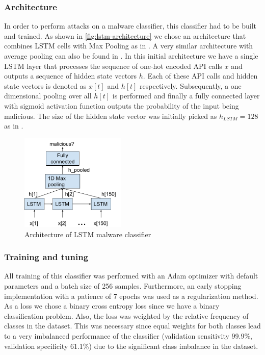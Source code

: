 \documentclass[final]{cvpr}
\begin{document}
\subsubsection{Architecture}
In order to perform attacks on a malware classifier, this classifier had to be 
built and trained. As shown in \autoref{fig:lstm-architecture} we chose an 
architecture that combines LSTM cells with Max Pooling as in 
\autocite[4]{agrawal2018robust}. A very similar architecture 
with average pooling can also be found in \autocite[4]{papernot2016crafting}. 
In this initial architecture we have a single LSTM layer that processes the 
sequence of one-hot encoded API calls $x$ and outputs a sequence of 
hidden state vectors $h$. Each of these API calls and hidden state vectors is 
denoted as $x[t]$ and $h[t]$ respectively. Subsequently, a one dimensional 
pooling over all $h[t]$ is 
performed and finally a fully connected layer with sigmoid activation function 
outputs the probability of the input being malicious. The size of the hidden 
state vector was initially picked as $h_{LSTM} = 128$ as in 
\autocite[10]{DBLP:journals/corr/RosenbergSRE17}.
\begin{figure}
	\centering
	\includegraphics[width=5cm]{lstm-architecture}
	\caption{Architecture of LSTM malware classifier}
	\label{fig:lstm-architecture}
\end{figure}
\subsubsection{Training and tuning}
\label{sec:train}
All training of this classifier was performed with an Adam optimizer 
\autocite{kingma2017adam} with default parameters and a batch size of 256 
samples. Furthermore, an early stopping implementation \autocite{Sunde20} with 
a patience of 7 epochs was used as a regularization method. As a loss we chose 
a binary cross entropy loss since we have a binary classification problem. 
Also, the loss was weighted by the relative frequency of classes in the 
dataset. This was necessary since equal weights for both classes lead to a very 
imbalanced performance of the classifier (validation sensitivity 99.9\%, 
validation specificity 61.1\%) due to the significant class imbalance in the 
dataset.
\end{document}

